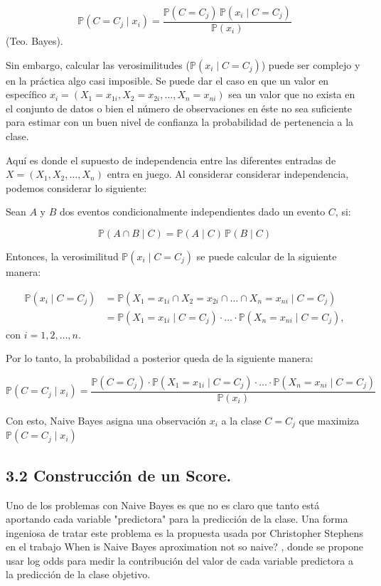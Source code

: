\documentclass[
 12pt,
 letterpaper,
]{article}
\theoremstyle{teoremaBreak}
\theoremstyle{plain}
\theoremstyle{definition}
\begin{document}
\[
\mathbb{P}(C = C_j \mid x_i) = \dfrac{\mathbb{P}(C = C_j)\,\mathbb{P}(x_i \mid C = C_j)}{\mathbb{P}(x_i)}
\]
(Teo. Bayes).

Sin embargo, calcular las verosimilitudes ($\mathbb{P}(x_i \mid C = C_j)$)
puede ser complejo y en la práctica algo casi imposible. Se puede dar el
caso en que un valor en específico $x_i = (X_1 = x_{1i}, X_2 = x_{2i}, \ldots, X_n
= x_{ni})$ sea un valor que no exista en el conjunto de datos o bien el
número de observaciones en éste no sea suficiente para estimar con un
buen nivel de confianza la probabilidad de pertenencia a la clase.

Aquí es donde el supuesto de independencia entre las diferentes entradas
de $X = (X_1, X_2, \ldots, X_n)$ entra en juego. Al considerar considerar
independencia, podemos considerar lo siguiente:

Sean $A$ y $B$ dos eventos condicionalmente independientes dado un evento $C$,
si:

\[
\mathbb{P}(A \cap B \mid C) = \mathbb{P}(A \mid C)\,\mathbb{P}(B \mid C)
\]

Entonces, la verosimilitud $\mathbb{P}(x_i \mid C = C_j)$ se puede calcular de
la siguiente manera:

\begin{align*}
\mathbb{P}(x_i \mid C = C_j)
&= \mathbb{P}(X_1 = x_{1i} \cap X_2 = x_{2i} \cap \ldots \cap X_n = x_{ni} \mid C = C_j) \\
&= \mathbb{P}(X_1 = x_{1i} \mid C = C_j) \cdot \ldots \cdot \mathbb{P}(X_n = x_{ni} \mid C = C_j),
\end{align*}
con $i = 1, 2, \ldots, n$.

Por lo tanto, la probabilidad a posterior queda de la siguiente manera:

\[
\mathbb{P}(C = C_j \mid x_i) = \dfrac{\mathbb{P}(C = C_j) \cdot \mathbb{P}(X_1 = x_{1i} \mid C = C_j) \cdot
\ldots \cdot \mathbb{P}(X_n = x_{ni} \mid C = C_j)}{\mathbb{P}(x_i)}
\]

Con esto, Naive Bayes asigna una observación $x_i$ a la clase $C = C_j$ que
maximiza $\mathbb{P}(C = C_j \mid x_i)$

\subsection{3.2 Construcción de un Score.}\label{naive-bayes-a-partir-de-log-odds.}
Uno de los problemas con Naive Bayes es que no es claro que tanto está aportando cada variable "predictora" para la predicción de
la clase. Una forma ingeniosa de tratar este problema es la propuesta usada por Christopher Stephens en el trabajo When is Naive Bayes
aproximation not so naive? , donde se propone usar log odds para medir la contribución del valor de cada variable predictora a la predicción de la clase objetivo.
\end{document}
